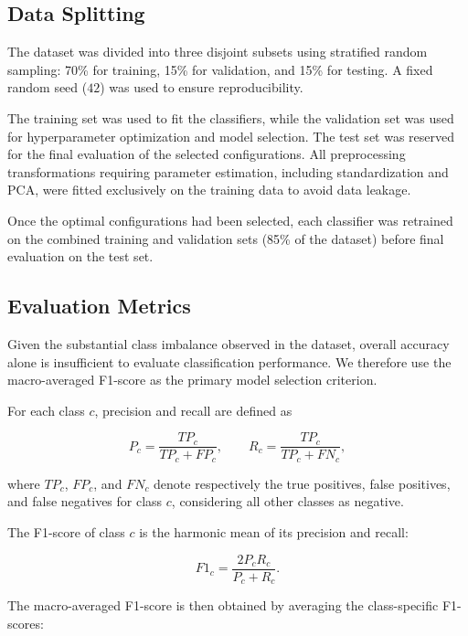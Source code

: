 \documentclass[10pt,a4paper]{article}
\begin{document}
\subsection{Data Splitting}

The dataset was divided into three disjoint subsets using
stratified random sampling: 70\% for training, 15\% for
validation, and 15\% for testing. A fixed random seed
($42$) was used to ensure reproducibility.

The training set was used to fit the classifiers, while
the validation set was used for hyperparameter optimization
and model selection. The test set was reserved for the
final evaluation of the selected configurations.
All preprocessing transformations requiring parameter
estimation, including standardization and PCA, were fitted
exclusively on the training data to avoid data leakage.

Once the optimal configurations had been selected,
each classifier was retrained on the combined training
and validation sets (85\% of the dataset) before final
evaluation on the test set.


\subsection{Evaluation Metrics}

Given the substantial class imbalance observed in the
dataset, overall accuracy alone is insufficient to
evaluate classification performance. We therefore
use the macro-averaged F1-score as the primary
model selection criterion.

For each class $c$, precision and recall are defined as

\begin{equation}
P_c = \frac{TP_c}{TP_c+FP_c},
\qquad
R_c = \frac{TP_c}{TP_c+FN_c},
\end{equation}

where $TP_c$, $FP_c$, and $FN_c$ denote respectively
the true positives, false positives, and false
negatives for class $c$, considering all other
classes as negative.

The F1-score of class $c$ is the harmonic mean
of its precision and recall:

\begin{equation}
F1_c = \frac{2P_cR_c}{P_c+R_c}.
\end{equation}

The macro-averaged F1-score is then obtained
by averaging the class-specific F1-scores:
\end{document}
